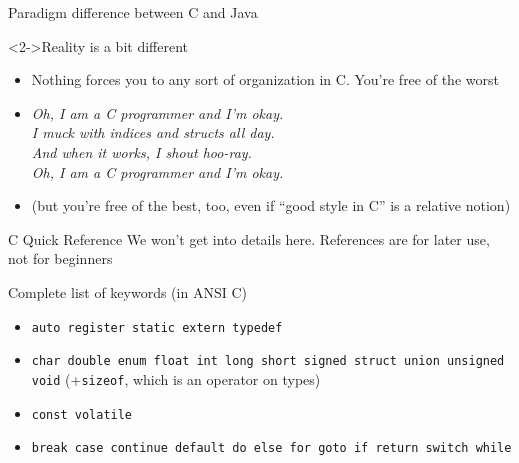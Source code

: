 \begin{Coupe}
\begin{frame}{Paradigm difference between C and Java}
  \begin{block}<2->{Reality is a bit different}
    \begin{itemize}
    \item Nothing forces you to any sort of organization in C. You're free of
      the worst
    \item[] \textit{Oh, I am a C programmer and I'm okay. \\
        I muck with indices and structs all day. \\
        And when it works, I shout hoo-ray. \\
        Oh, I am a C programmer and I'm okay.}
    \item (but you're free of the best, too, even if ``good style in C'' is a
      relative notion)
    \end{itemize}
  \end{block}
  
\end{frame}
\begin{frame}[squeeze]{C Quick Reference}
  \alert{We won't get into details here. References are for later use, not for beginners}

  \begin{block}{Complete list of keywords (in ANSI C)}
    \begin{itemize}\vspace{-.2\baselineskip}
    \item {} {\small\tt auto register static extern typedef}
    \item {} {\small\tt char double enum float int long short
      signed struct union unsigned void} (+{\small\tt sizeof}, which is an operator on types)
    \item {} {\small\tt const volatile}
    \item {} {\small\tt break case continue default do else
      for goto if return switch while}
    \end{itemize}
  \end{block}\vspace{-.6\baselineskip}


\end{frame}
\end{Coupe}

